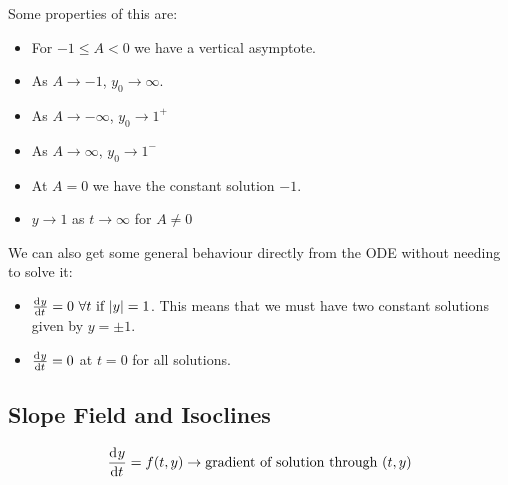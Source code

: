 \documentclass[../main.tex]{subfiles}
\begin{document}
\begin{example}
\begin{center}
  \end{center}
  Some properties of this are:
  \begin{itemize}
    \item For $-1 \leq A < 0$ we have a vertical asymptote.
    \item As $A \to -1$, $y_0 \to \infty$.
    \item As $A \to - \infty$, $y_0 \to 1^{+}$
    \item As $A \to \infty$, $y_0 \to 1^{-}$
    \item At $A = 0$ we have the constant solution $-1$.
    \item $y \to 1$ as $t \to \infty$ for $A \neq 0$
  \end{itemize}
  We can also get some general behaviour directly from the ODE without needing to solve it:
  \begin{itemize}
    \item $\deriv{y}{t} = 0\ \forall t \text{ if } |y| = 1$.
      This means that we must have two constant solutions given by $y = \pm 1$.
    \item $\deriv{y}{t} = 0$ at $t = 0$ for all solutions.
  \end{itemize}
\end{example}
\subsection{Slope Field and Isoclines}
\[
  \deriv{y}{t} = f(t, y) \rightarrow \text{gradient of solution through }(t, y)
\]
\end{document}
